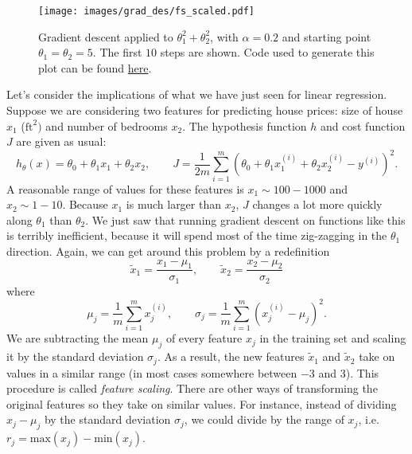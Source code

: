 \documentclass{article}
\theoremstyle{definition}
\begin{document}
\begin{figure}[ht]
\centering
\texttt{[image: images/grad\_des/fs\_scaled.pdf]}
\caption{Gradient descent applied to $\theta_1^2+\theta_2^2$, with $\alpha=0.2$ and starting point $\theta_1=\theta_2=5$. The first $10$ steps are shown. Code used to generate this plot can be found \href{https://github.com/siavashaslanbeigi/ml_notes/blob/master/src/grad_des/feature_scaling.ipynb}{\color{blue} here}.}
\label{graddes-fig:fs-scaled}
\end{figure}

Let's consider the implications of what we have just seen for linear regression. Suppose we are considering two features for predicting house prices: size of house $x_1$ ($\text{ft}^2)$ and number of bedrooms $x_2$. The hypothesis function $h$ and cost function $J$ are given as usual:
\begin{equation}
    h_{\theta}(x)=\theta_0+\theta_1x_1+\theta_2x_2, \qquad
    J=\frac{1}{2m}\sum_{i=1}^{m}(\theta_0+\theta_1x^{(i)}_1+\theta_2x^{(i)}_2-y^{(i)})^2.
\end{equation}
A reasonable range of values for these features is $x_1\sim 100-1000$ and $x_2\sim 1-10$. Because $x_1$ is much larger than $x_2$, $J$ changes a lot more quickly along $\theta_1$ than $\theta_2$. We just saw that running gradient descent on functions like this is terribly inefficient, because it will spend most of the time zig-zagging in the $\theta_1$ direction. Again, we can get around this problem by a redefinition
\begin{equation}
    \tilde{x}_1 = \frac{x_1 - \mu_1}{\sigma_1}, \qquad
    \tilde{x}_2 = \frac{x_2 - \mu_2}{\sigma_2}
    \label{graddes-eq:fs-linreg}
\end{equation}
where
\begin{equation}
    \mu_j = \frac{1}{m}\sum_{i=1}^{m}x^{(i)}_j, \qquad
    \sigma_j = \frac{1}{m}\sum_{i=1}^{m}(x^{(i)}_j-\mu_j)^2.
\end{equation}
We are subtracting the mean $\mu_j$ of every feature $x_j$ in the training set and scaling it by the standard deviation $\sigma_j$. As a result, the new features $\tilde{x}_1$ and $\tilde{x}_2$ take on values in a similar range (in most cases somewhere between $-3$ and $3$). This procedure is called \textit{feature scaling}. There are other ways of transforming the original features so they take on similar values. For instance, instead of dividing $x_j - \mu_j$ by the standard deviation $\sigma_j$, we could divide by the range of $x_j$, i.e. $r_j=\text{max}(x_j)-\text{min}(x_j)$.
\end{document}

